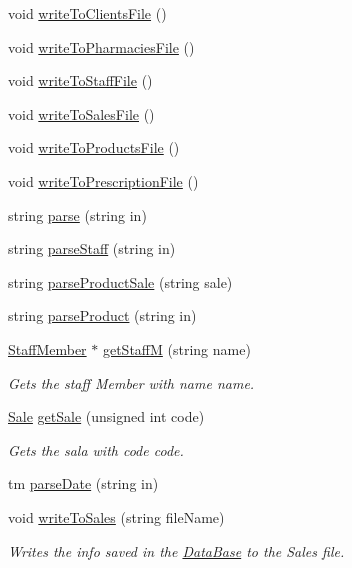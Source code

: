 \begin{DoxyCompactItemize}
void \hyperlink{classDataBase_a4d855ccf967f4f741646100d2c890ede}{write\+To\+Clients\+File} ()
\item 
void \hyperlink{classDataBase_aef0dc00d9d40159c361518e60e78f857}{write\+To\+Pharmacies\+File} ()
\item 
void \hyperlink{classDataBase_abc8c8d3116c6b3422d87ae781ba91538}{write\+To\+Staff\+File} ()
\item 
void \hyperlink{classDataBase_a62cb54f7bbcd213d71f604003298cd95}{write\+To\+Sales\+File} ()
\item 
void \hyperlink{classDataBase_a108ba0eb315d14ed6bc7181b98499318}{write\+To\+Products\+File} ()
\item 
void \hyperlink{classDataBase_a1435e1728598586503f199981b84a933}{write\+To\+Prescription\+File} ()
\item 
string \hyperlink{classDataBase_aa7cfe42e76e1d57c0adfb82d0c82f96e}{parse} (string in)
\item 
string \hyperlink{classDataBase_ae547604cf1c5a0c937139928a3a700b5}{parse\+Staff} (string in)
\item 
string \hyperlink{classDataBase_a5310a888c5c94fc87135b5cf8b9267f5}{parse\+Product\+Sale} (string sale)
\item 
string \hyperlink{classDataBase_ab0744d4be63a6db44fdcf21c22d61914}{parse\+Product} (string in)
\item 
\hyperlink{classStaffMember}{Staff\+Member} $\ast$ \hyperlink{classDataBase_af3c7f6a88b927dbd01b34121eefabe4d}{get\+StaffM} (string name)
\begin{DoxyCompactList}\small\item\em Gets the staff Member with name name. \end{DoxyCompactList}\item 
\hyperlink{classSale}{Sale} \hyperlink{classDataBase_af233d5e69141c780d6a7946b1810a7a6}{get\+Sale} (unsigned int code)
\begin{DoxyCompactList}\small\item\em Gets the sala with code code. \end{DoxyCompactList}\item 
tm \hyperlink{classDataBase_aa63ea6b1a96135acd1839ae9a0983d3f}{parse\+Date} (string in)
\item 
void \hyperlink{classDataBase_a0bf85b7fb0feb4fb1f6888ba58ebe2b2}{write\+To\+Sales} (string file\+Name)
\begin{DoxyCompactList}\small\item\em Writes the info saved in the \hyperlink{classDataBase}{Data\+Base} to the Sales file. \end{DoxyCompactList}\item 

\end{DoxyCompactItemize}
